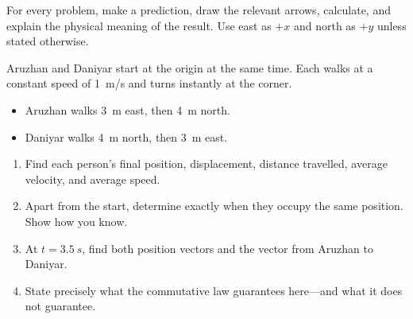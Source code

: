 \documentclass[11pt,a4paper]{article}
\begin{document}


\vspace{0.55em}
For every problem, make a prediction, draw the relevant arrows, calculate, and explain the physical meaning of the result. Use east as $+x$ and north as $+y$ unless stated otherwise.



Aruzhan and Daniyar start at the origin at the same time. Each walks at a constant speed of \SI{1}{m/s} and turns instantly at the corner.

\begin{itemize}[leftmargin=*,itemsep=0.25em]
  \item Aruzhan walks \SI{3}{m} east, then \SI{4}{m} north.
  \item Daniyar walks \SI{4}{m} north, then \SI{3}{m} east.
\end{itemize}


\begin{center}
\end{center}

\begin{enumerate}[label=\alph*)]
  \item Find each person's final position, displacement, distance travelled, average velocity, and average speed.
  \item Apart from the start, determine exactly when they occupy the same position. Show how you know.
  \item At $t=\SI{3.5}{s}$, find both position vectors and the vector from Aruzhan to Daniyar.
  \item State precisely what the commutative law guarantees here—and what it does not guarantee.
\end{enumerate}
\end{document}

